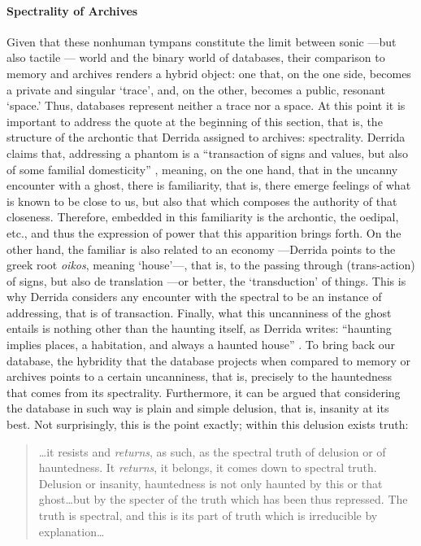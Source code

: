 \paragraph{Spectrality of Archives}
Given that these nonhuman tympans constitute the limit between sonic ---but also tactile \parencite[223]{Eck13:Bet}--- world and the binary world of databases, their comparison to memory and archives renders a hybrid object: one that, on the one side, becomes a private and singular `trace', and, on the other, becomes a public, resonant `space.' Thus, databases represent neither a trace nor a space. At this point it is important to address the quote at the beginning of this section, that is, the structure of the archontic that Derrida assigned to archives: spectrality. Derrida claims that, addressing a phantom is a ``transaction of signs and values, but also of some familial domesticity'' \parencite[55]{Der95:Arc}, meaning, on the one hand, that in the uncanny encounter with a ghost, there is familiarity, that is, there emerge feelings of what is known to be close to us, but also that which composes the authority of that closeness. Therefore, embedded in this familiarity is the archontic, the oedipal, etc., and thus the expression of power that this apparition brings forth. On the other hand, the familiar is also related to an economy ---Derrida points to the greek root \textit{oikos}, meaning `house'---, that is, to the passing through (trans-action) of signs, but also de translation ---or better, the `transduction' of things. This is why Derrida considers any encounter with the spectral to be an instance of addressing, that is of transaction. Finally, what this uncanniness of the ghost entails is nothing other than the haunting itself, as Derrida writes: ``haunting implies places, a habitation, and always a haunted house'' \parencite[55]{Der95:Arc}. To bring back our database, the hybridity that the database projects when compared to memory or archives points to a certain uncanniness, that is, precisely to the hauntedness that comes from its spectrality. Furthermore, it can be argued that considering the database in such way is plain and simple delusion, that is, insanity at its best. Not surprisingly, this is the point exactly; within this delusion exists truth:

\begin{quote}
	\dots it resists and \textit{returns}, as such, as the spectral truth of delusion or of hauntedness. It \textit{returns}, it belongs, it comes down to spectral truth. Delusion or insanity, hauntedness is not only haunted by this or that ghost\dots but by the specter of the truth which has been thus repressed. The truth is spectral, and this is its part of truth which is irreducible by explanation\dots \parencite[54-56]{Der95:Arc}
\end{quote} %

